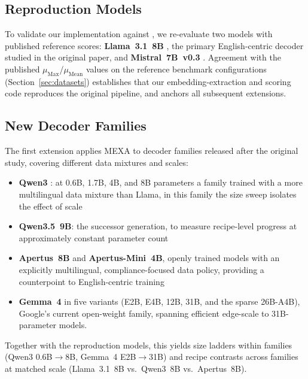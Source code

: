 \subsection{Reproduction Models}
\label{subsec:reproduction-models}

To validate our implementation against \citet{kargaran2025mexa}, we
re-evaluate two models with published reference scores:
\textbf{Llama~3.1~8B} \citep{dubey2024llama3}, the primary English-centric
decoder studied in the original paper, and \textbf{Mistral~7B~v0.3}
\citep{jiang2023mistral}. Agreement with the published
$\mu_{\text{Max}}$/$\mu_{\text{Mean}}$ values on the reference benchmark
configurations (Section~\ref{sec:datasets}) establishes that our
embedding-extraction and scoring code reproduces the original pipeline,
and anchors all subsequent extensions.

\subsection{New Decoder Families}
\label{subsec:new-decoders}

The first extension applies MEXA to decoder families released after the
original study, covering different data mixtures and scales:

\begin{itemize}
    \item \textbf{Qwen3} \citep{yang2025qwen3} : at 0.6B, 1.7B, 4B, and 8B
    parameters a family trained with a  more multilingual
    data mixture than Llama, in this family the size sweep isolates the
    effect of scale 
    \item \textbf{Qwen3.5~9B}: the successor generation, to measure
    recipe-level progress at approximately constant parameter count
    \item \textbf{Apertus~8B} and \textbf{Apertus-Mini~4B}, openly trained
    models with an explicitly multilingual, compliance-focused data
    policy, providing a counterpoint to English-centric training
    \item \textbf{Gemma~4} in five variants (E2B, E4B, 12B, 31B, and the
    sparse 26B-A4B), Google's current open-weight family, spanning
    efficient edge-scale to 31B-parameter models.
\end{itemize}

\noindent
Together with the reproduction models, this yields size ladders within
families (Qwen3 0.6B$\to$8B, Gemma~4 E2B$\to$31B) and recipe contrasts
across families at matched scale (Llama~3.1~8B vs.\ Qwen3~8B vs.\
Apertus~8B).

